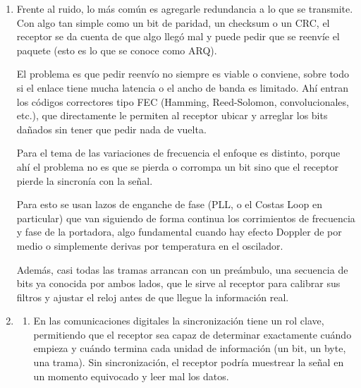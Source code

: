 \documentclass[11pt,a4paper]{article}
\begin{document}
\begin{enumerate}[label=\arabic*)]
\begin{enumerate}[label=\alph*)]
          El SNR es la relación entre señal y ruido. Indica qué tan afectada se encuentra la señal útil por el ruido. Mientras mayor es el SNR, mejor, ya que indica que la señal útil es más fuerte.

          Se puede inferir una relación con el BER: una señal con un SNR bajo indica que el ruido se está imponiendo a la señal útil. Esto influye directamente en la tasa de errores de bits en una comunicación digital, por lo que este indicador aumentará.

        \end{enumerate}
  \item
              Frente al ruido, lo más común es agregarle redundancia a lo que se transmite.
      Con algo tan simple como un bit de paridad, un checksum o un CRC, el receptor
      se da cuenta de que algo llegó mal y puede pedir que se reenvíe el paquete
      (esto es lo que se conoce como ARQ).

      El problema es que pedir reenvío no siempre es viable o conviene, sobre todo
      si el enlace tiene mucha latencia o el ancho de banda es limitado. Ahí entran
      los códigos correctores tipo FEC (Hamming, Reed-Solomon, convolucionales,
      etc.), que directamente le permiten al receptor ubicar y arreglar los bits
      dañados sin tener que pedir nada de vuelta.

      Para el tema de las variaciones de frecuencia el enfoque es distinto, porque
      ahí el problema no es que se pierda o corrompa un bit sino que el receptor
      pierde la sincronía con la señal.

      Para esto se usan lazos de enganche de fase (PLL, o el Costas Loop en
      particular) que van siguiendo de forma continua los corrimientos de frecuencia
      y fase de la portadora, algo fundamental cuando hay efecto Doppler de por
      medio o simplemente derivas por temperatura en el oscilador.

      Además, casi todas las tramas arrancan con un preámbulo, una secuencia de bits
      ya conocida por ambos lados, que le sirve al receptor para calibrar sus filtros
      y ajustar el reloj antes de que llegue la información real. 
  \item
        \begin{enumerate}[label=\alph*)]
          \item
                En las comunicaciones digitales la sincronización tiene un rol clave, permitiendo que el receptor sea capaz de determinar exactamente cuándo empieza y cuándo termina cada unidad de información (un bit, un byte, una trama). Sin sincronización, el receptor podría muestrear la señal en un momento equivocado y leer mal los datos.


\end{enumerate}
\end{enumerate}
\end{document}
